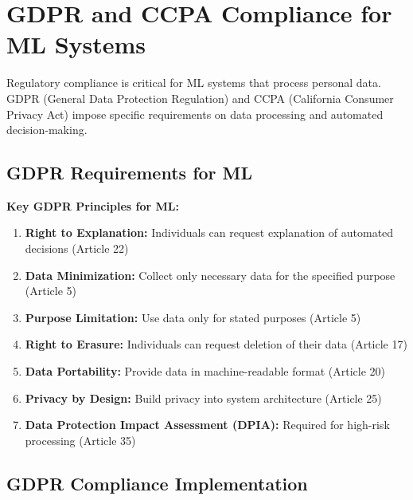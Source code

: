 \section{GDPR and CCPA Compliance for ML Systems}

Regulatory compliance is critical for ML systems that process personal data. GDPR (General Data Protection Regulation) and CCPA (California Consumer Privacy Act) impose specific requirements on data processing and automated decision-making.

\subsection{GDPR Requirements for ML}

\textbf{Key GDPR Principles for ML:}

\begin{enumerate}
    \item \textbf{Right to Explanation:} Individuals can request explanation of automated decisions (Article 22)
    \item \textbf{Data Minimization:} Collect only necessary data for the specified purpose (Article 5)
    \item \textbf{Purpose Limitation:} Use data only for stated purposes (Article 5)
    \item \textbf{Right to Erasure:} Individuals can request deletion of their data (Article 17)
    \item \textbf{Data Portability:} Provide data in machine-readable format (Article 20)
    \item \textbf{Privacy by Design:} Build privacy into system architecture (Article 25)
    \item \textbf{Data Protection Impact Assessment (DPIA):} Required for high-risk processing (Article 35)
\end{enumerate}

\subsection{GDPR Compliance Implementation}

